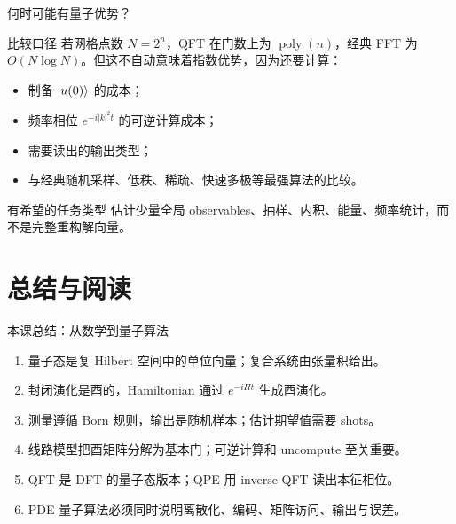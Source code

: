 \documentclass[aspectratio=169,10pt]{ctexbeamer}
\newcommand{\poly}{\operatorname{poly}}
\begin{document}
\begin{frame}{何时可能有量子优势？}
\begin{keybox}{比较口径}
若网格点数 $N=2^n$，QFT 在门数上为 $\poly(n)$，经典 FFT 为 $O(N\log N)$。但这不自动意味着指数优势，因为还要计算：
\begin{itemize}
\item 制备 $\ket{u(0)}$ 的成本；
\item 频率相位 $e^{-i|k|^2t}$ 的可逆计算成本；
\item 需要读出的输出类型；
\item 与经典随机采样、低秩、稀疏、快速多极等最强算法的比较。
\end{itemize}
\end{keybox}
\begin{warnbox}{有希望的任务类型}
估计少量全局 observables、抽样、内积、能量、频率统计，而不是完整重构解向量。
\end{warnbox}
\end{frame}

\section{总结与阅读}

\begin{frame}{本课总结：从数学到量子算法}
\begin{enumerate}
\item 量子态是复 Hilbert 空间中的单位向量；复合系统由张量积给出。
\item 封闭演化是酉的，Hamiltonian 通过 $e^{-iHt}$ 生成酉演化。
\item 测量遵循 Born 规则，输出是随机样本；估计期望值需要 shots。
\item 线路模型把酉矩阵分解为基本门；可逆计算和 uncompute 至关重要。
\item QFT 是 DFT 的量子态版本；QPE 用 inverse QFT 读出本征相位。
\item PDE 量子算法必须同时说明离散化、编码、矩阵访问、输出与误差。
\end{enumerate}
\end{frame}
\end{document}
